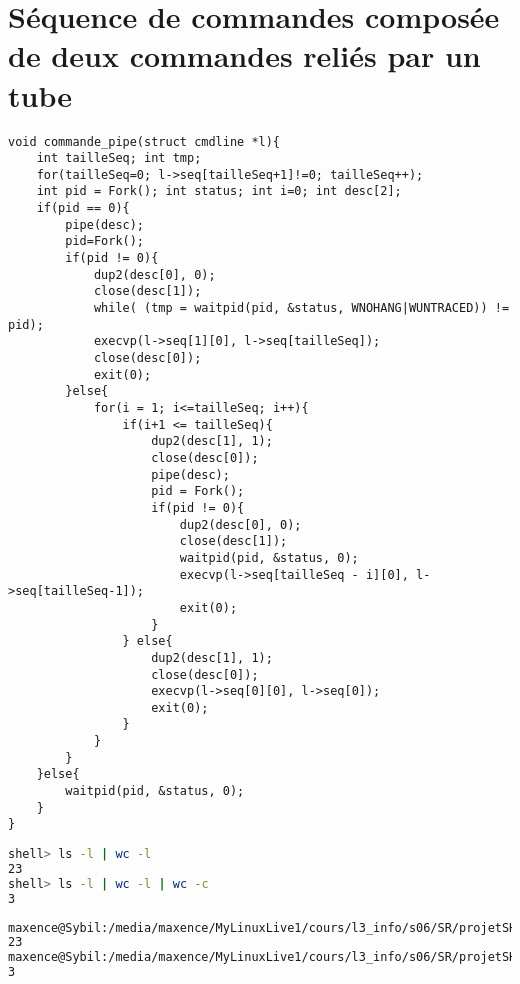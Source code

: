 \documentclass{report}
\begin{document}
		\section{S\'equence de commandes compos\'ee de deux commandes reli\'es par un tube}
			\begin{lstlisting}
void commande_pipe(struct cmdline *l){
	int tailleSeq; int tmp;
	for(tailleSeq=0; l->seq[tailleSeq+1]!=0; tailleSeq++);
	int pid = Fork(); int status; int i=0; int desc[2];
	if(pid == 0){
		pipe(desc);
		pid=Fork();
		if(pid != 0){
			dup2(desc[0], 0);
			close(desc[1]);
			while( (tmp = waitpid(pid, &status, WNOHANG|WUNTRACED)) != pid);
			execvp(l->seq[1][0], l->seq[tailleSeq]);
			close(desc[0]);
			exit(0);
		}else{
			for(i = 1; i<=tailleSeq; i++){
				if(i+1 <= tailleSeq){
					dup2(desc[1], 1);
					close(desc[0]);
					pipe(desc);
					pid = Fork();
					if(pid != 0){
						dup2(desc[0], 0);
						close(desc[1]);
						waitpid(pid, &status, 0);
						execvp(l->seq[tailleSeq - i][0], l->seq[tailleSeq-1]);
						exit(0);
					}
				} else{
					dup2(desc[1], 1);
					close(desc[0]);
					execvp(l->seq[0][0], l->seq[0]);
					exit(0);
				}
			}		
		}
	}else{
		waitpid(pid, &status, 0);
	}
}
			\end{lstlisting}
			\begin{lstlisting}[frame=single,basicstyle=\footnotesize,language=bash]
shell> ls -l | wc -l
23
shell> ls -l | wc -l | wc -c
3
			\end{lstlisting}
			\begin{lstlisting}[frame=single,basicstyle=\footnotesize,language=bash]
maxence@Sybil:/media/maxence/MyLinuxLive1/cours/l3_info/s06/SR/projetSHELL$ ls -l | wc -l
23
maxence@Sybil:/media/maxence/MyLinuxLive1/cours/l3_info/s06/SR/projetSHELL$ ls -l | wc -l | wc -c
3
			\end{lstlisting}
\end{document}
